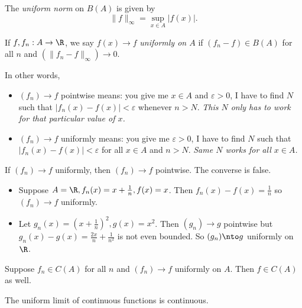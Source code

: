 \documentclass[a4paper]{article}
\theoremstyle{definition}
\begin{document}
\begin{definition}
  The \emph{uniform norm} on \(B(A)\) is given by
  \[
    \|f\|_\infty = \sup_{x\in A} |f(x)|.
  \]
\end{definition}

\begin{definition}
  If \(f, f_n: A\to \R\), we say \(f(x) \to f\) \emph{uniformly on \(A\)} if \((f_n-f) \in B(A)\) for all \(n\) and \((\|f_n-f\|_\infty)\to0\).
\end{definition}
    In other words,
    \begin{itemize}
    \item \((f_n)\to f\) pointwise means: you give me \(x\in A\) and \(\varepsilon >0\), I have to find \(N\) such that \(|f_n(x) - f(x)| < \varepsilon\) whenever \(n> N\). \emph{This \(N\) only has to work for that particular value of \(x\).}
    \item \((f_n)\to f\) uniformly means: you give me \(\varepsilon>0\), I have to find \(N\) such that \(|f_n(x) - f(x)|<\varepsilon\) for all \(x\in A\) and \(n>N\). \emph{Same \(N\) works for all \(x\in A\).}
\end{itemize}

\begin{ex}
  If \((f_n)\to f \) uniformly, then \((f_n)\to f\) pointwise. The converse is false.
\end{ex}

\begin{eg}\leavevmode
  \begin{itemize}
  \item Suppose \(A=\R,f_n(x)=x+\frac{1}{n},f(x)=x\). Then \(f_n(x)-f(x)=\frac{1}{n}\) so \((f_n)\to f\) uniformly.
  \item Let \(g_n(x) = (x+\frac{1}{n})^2, g(x) = x^2\). Then \((g_n)\to g\) pointwise but \(g_n(x) - g(x) = \frac{2x}{n} + \frac{1}{n^2}\) is not even bounded. So \((g_n)\nto g\) uniformly on \(\R\).
  \end{itemize}
\end{eg}

\begin{theorem}
  Suppose \(f_n \in C(A)\) for all \(n\) and \((f_n)\to f\) uniformly on \(A\). Then \(f\in C(A)\) as well.
\end{theorem}

\begin{slogan}
  The uniform limit of continuous functions is continuous.
\end{slogan}
\end{document}

